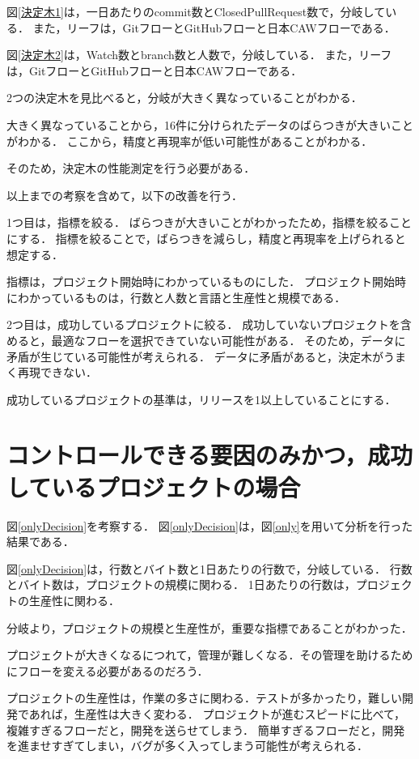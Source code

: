 図\ref{決定木1}は，一日あたりのcommit数とClosedPullRequest数で，分岐している．
また，リーフは，GitフローとGitHubフローと日本CAWフローである．


図\ref{決定木2}は，Watch数とbranch数と人数で，分岐している．
また，リーフは，GitフローとGitHubフローと日本CAWフローである．

2つの決定木を見比べると，分岐が大きく異なっていることがわかる．

大きく異なっていることから，16件に分けられたデータのばらつきが大きいことがわかる．
ここから，精度と再現率が低い可能性があることがわかる．



そのため，決定木の性能測定を行う必要がある．

以上までの考察を含めて，以下の改善を行う．

1つ目は，指標を絞る．
ばらつきが大きいことがわかったため，指標を絞ることにする．
指標を絞ることで，ばらつきを減らし，精度と再現率を上げられると想定する．

指標は，プロジェクト開始時にわかっているものにした．
プロジェクト開始時にわかっているものは，行数と人数と言語と生産性と規模である．

2つ目は，成功しているプロジェクトに絞る．
成功していないプロジェクトを含めると，最適なフローを選択できていない可能性がある．
そのため，データに矛盾が生じている可能性が考えられる．
データに矛盾があると，決定木がうまく再現できない．

成功しているプロジェクトの基準は，リリースを1以上していることにする．


\section{コントロールできる要因のみかつ，成功しているプロジェクトの場合}
図\ref{onlyDecision}を考察する．
図\ref{onlyDecision}は，図\ref{only}を用いて分析を行った結果である．

図\ref{onlyDecision}は，行数とバイト数と1日あたりの行数で，分岐している．
行数とバイト数は，プロジェクトの規模に関わる．
1日あたりの行数は，プロジェクトの生産性に関わる．

分岐より，プロジェクトの規模と生産性が，重要な指標であることがわかった．

プロジェクトが大きくなるにつれて，管理が難しくなる．その管理を助けるためにフローを変える必要があるのだろう．

プロジェクトの生産性は，作業の多さに関わる．テストが多かったり，難しい開発であれば，生産性は大きく変わる．
プロジェクトが進むスピードに比べて，複雑すぎるフローだと，開発を送らせてしまう．
簡単すぎるフローだと，開発を進ませすぎてしまい，バグが多く入ってしまう可能性が考えられる．



